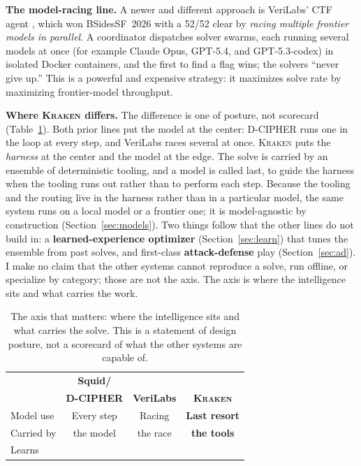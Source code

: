\documentclass[10pt,twocolumn]{article}
\newcommand{\xmark}{\textcolor{hair}{\ding{55}}}
\newcommand{\wmark}{\textbf{\ding{51}}}
\newcommand{\kraken}{\textsc{Kraken}}
\begin{document}
\medskip
\textbf{The model-racing line.} A newer and different approach is VeriLabs' CTF agent
\cite{verialabs2026}, which won BSidesSF~2026 with a 52/52 clear by \emph{racing multiple frontier
models in parallel}. A coordinator dispatches solver swarms, each running several models at once (for
example Claude Opus, GPT-5.4, and GPT-5.3-codex) in isolated Docker containers, and the first to find
a flag wins; the solvers ``never give up.'' This is a powerful and expensive strategy: it maximizes
solve rate by maximizing frontier-model throughput.

\medskip
\textbf{Where \kraken{} differs.} The difference is one of posture, not scorecard (Table~\ref{tab:novelty}).
Both prior lines put the model at the center: D-CIPHER runs one in the loop at every step, and VeriLabs
races several at once. \kraken{} puts the \emph{harness} at the center and the model at the edge. The
solve is carried by an ensemble of deterministic tooling, and a model is called last, to guide the
harness when the tooling runs out rather than to perform each step. Because the tooling and the routing
live in the harness rather than in a particular model, the same system runs on a local model or a
frontier one; it is model-agnostic by construction (Section~\ref{sec:models}). Two things follow that
the other lines do not build in: a \textbf{learned-experience optimizer} (Section~\ref{sec:learn}) that
tunes the ensemble from past solves, and first-class \textbf{attack-defense} play (Section~\ref{sec:ad}).
I make no claim that the other systems cannot reproduce a solve, run offline, or specialize by category;
those are not the axis. The axis is where the intelligence sits and what carries the work.

\begin{table}[t]
  \centering\small
  \setlength{\tabcolsep}{6pt}\renewcommand{\arraystretch}{1.3}
  \setlength{\tabcolsep}{4pt}
  \begin{tabular}{@{}l ccc@{}}
    \toprule
    & \textbf{Squid/} & & \\[-2pt]
    & \textbf{D-CIPHER} & \textbf{VeriLabs} & \textbf{\kraken{}} \\
    \midrule
    Model use   & Every step & Racing   & \textbf{Last resort} \\
    Carried by  & the model  & the race & \textbf{the tools} \\
    Learns      & \xmark     & \xmark   & \wmark \\
    \bottomrule
  \end{tabular}
  \caption{The axis that matters: where the intelligence sits and what carries the solve. This is a
  statement of design posture, not a scorecard of what the other systems are capable of.}
  \label{tab:novelty}
\end{table}
\end{document}
